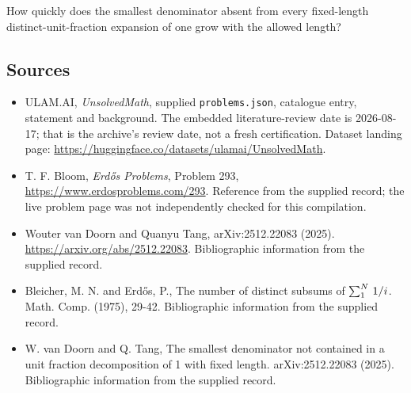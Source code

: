 \documentclass[11pt,a4paper]{article}
\begin{document}
How quickly does the smallest denominator absent from every fixed-length distinct-unit-fraction expansion of one grow with the allowed length?

\subsection{Sources}

{\small

\begin{itemize}

\item[\hypertarget{source:statement:1}{S1}] ULAM.AI, \emph{UnsolvedMath}, supplied \texttt{problems.json}, catalogue entry, statement and background. The embedded literature-review date is 2026-08-17; that is the archive’s review date, not a fresh certification. Dataset landing page: \url{https://huggingface.co/datasets/ulamai/UnsolvedMath}.

\item[\hypertarget{source:statement:2}{S2}] T. F. Bloom, \emph{Erdős Problems}, Problem 293, \url{https://www.erdosproblems.com/293}. Reference from the supplied record; the live problem page was not independently checked for this compilation.

\item[\hypertarget{source:statement:3}{S3}] Wouter van Doorn and Quanyu Tang, arXiv:2512.22083 (2025). \url{https://arxiv.org/abs/2512.22083}. Bibliographic information from the supplied record.

\item[\hypertarget{source:statement:4}{S4}] Bleicher, M. N. and Erd\H{o}s, P., The number of distinct subsums of $\sum \sb{1}^{N}\,1/i$. Math. Comp. (1975), 29-42. Bibliographic information from the supplied record.

\item[\hypertarget{source:statement:5}{S5}] W. van Doorn and Q. Tang, The smallest denominator not contained in a unit fraction decomposition of 1 with fixed length. arXiv:2512.22083 (2025). Bibliographic information from the supplied record.

\end{itemize}

}

\label{end:statement}
\end{document}
